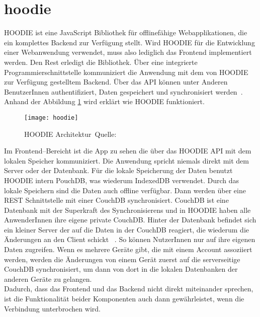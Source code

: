 \section{hoodie}
HOODIE ist eine JavaScript Bibliothek für offlinefähige Webapplikationen, die ein komplettes Backend zur Verfügung stellt. Wird HOODIE für die Entwicklung einer Webanwendung verwendet, muss also lediglich das Frontend implementiert werden. Den Rest erledigt die Bibliothek. Über eine integrierte Programmierschnittstelle kommuniziert die Anwendung mit dem von HOODIE zur Verfügung gestelltem Backend. Über das \gls{API} können unter Anderen BenutzerInnen authentifiziert, Daten gespeichert und synchronisiert werden~\cite{hoodie}.\\
Anhand der Abbildung \ref{fig:hoodie} wird erklärt wie HOODIE funktioniert.
\begin{figure}[H]
  \centering
  \texttt{[image: hoodie]}
  \grayRule
  \caption[HOODIE Architektur]{HOODIE Architektur~Quelle:~\cite{hoodie-how}}
  \label{fig:hoodie}
\end{figure}
Im Frontend--Bereicht ist die App zu sehen die über das HOODIE \gls{API} mit dem lokalen Speicher kommuniziert. Die Anwendung spricht niemals direkt mit dem Server oder der Datenbank. Für die lokale Speicherung der Daten benutzt HOODIE intern PouchDB, was wiederum IndexedDB verwendet. Durch das lokale Speichern sind die Daten auch offline verfügbar. Dann werden über eine \gls{REST} Schnittstelle mit einer CouchDB synchronisiert. CouchDB ist eine Datenbank mit der Superkraft des Synchronisierens und in HOODIE haben alle AnwenderInnen ihre eigene private CouchDB. Hinter der Datenbank befindet sich ein kleiner Server der auf die Daten in der CouchDB reagiert, die wiederum die Änderungen an den Client schickt ~\cite{hoodie-how}.
So können NutzerInnen nur auf ihre eigenen Daten zugreifen. Wenn es mehrere Geräte gibt, die mit einem Account assoziiert werden, werden die Änderungen von einem Gerät zuerst auf die serverseitige CouchDB synchronisiert, um dann von dort in die lokalen Datenbanken der anderen Geräte zu gelangen.\\
Dadurch, dass das Frontend und das Backend nicht direkt miteinander sprechen, ist die Funktionalität beider Komponenten auch dann gewährleistet, wenn die Verbindung unterbrochen wird.